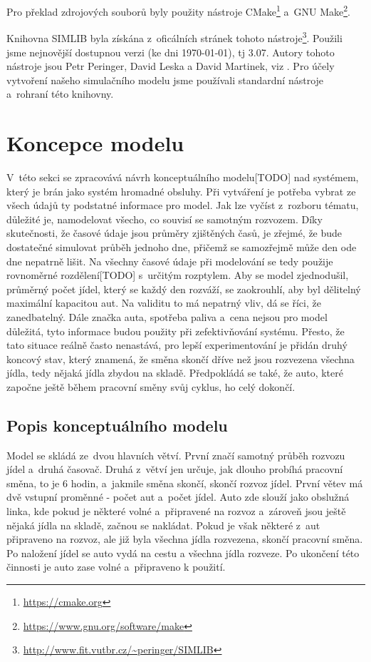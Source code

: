 \documentclass[a4paper, 11pt]{article}
\begin{document}
	Pro překlad zdrojových souborů byly použity nástroje
	CMake\footnote{\url{https://cmake.org}}
	a~GNU Make\footnote{\url{https://www.gnu.org/software/make}}.

	Knihovna SIMLIB byla získána z~oficálních stránek tohoto
	nástroje\footnote{\url{http://www.fit.vutbr.cz/~peringer/SIMLIB}}.
	Použili jsme nejnovější dostupnou verzi (ke dni \today), tj 3.07.
	Autory tohoto nástroje jsou Petr Peringer, David Leska a David Martinek,
	viz \cite{SIMLIB}. Pro účely vytvoření našeho simulačního modelu jsme
	používali standardní nástroje a~rohraní této knihovny.



	\section{Koncepce modelu}

	V~této sekci se zpracovává návrh konceptuálního modelu[TODO] nad
	systémem, který je brán jako systém hromadné obsluhy. Při vytváření
	je potřeba vybrat ze všech údajů ty podstatné informace pro model. Jak lze
	vyčíst z~rozboru tématu, důležité je, namodelovat všecho, co souvisí
	se samotným rozvozem. Díky skutečnosti, že časové údaje jsou průměry
	zjištěných časů, je zřejmé, že bude dostatečné simulovat průběh
	jednoho dne, přičemž se samozřejmě může den ode dne nepatrně lišit.
	Na všechny časové údaje při modelování se tedy použije rovnoměrné
	rozdělení[TODO] s~určitým rozptylem. Aby se model zjednodušil,
	průměrný počet jídel, který se každý den rozváží, se zaokrouhlí,
	aby byl dělitelný maximální kapacitou aut. Na validitu to má nepatrný
	vliv, dá se říci, že zanedbatelný. Dále značka auta, spotřeba paliva
	a~cena nejsou pro model důležitá, tyto informace budou použity při
	zefektivňování systému. Přesto, že tato situace reálně často nenastává,
	pro lepší experimentování je přidán druhý koncový stav, který znamená,
	že směna skončí dříve než jsou rozvezena všechna jídla, tedy nějaká
	jídla zbydou na skladě. Předpokládá se také, že auto, které započne
	ještě během pracovní směny svůj cyklus, ho celý dokončí.


	\subsection{Popis konceptuálního modelu}

	Model se skládá ze~dvou hlavních větví. První značí samotný průběh
	rozvozu jídel a~druhá časovač. Druhá z~větví jen určuje, jak dlouho
	probíhá pracovní směna, to je 6 hodin, a~jakmile směna skončí, skončí
	rozvoz jídel. První větev má dvě vstupní proměnné - počet aut a~počet
	jídel. Auto zde slouží jako obslužná linka, kde pokud je některé volné
	a~připravené na rozvoz a~zároveň jsou ještě nějaká jídla na skladě,
	začnou se nakládat. Pokud je však některé z~aut připraveno na rozvoz,
	ale již byla všechna jídla rozvezena, skončí pracovní směna. Po
	naložení jídel se auto vydá na cestu a všechna jídla rozveze. Po ukončení
	této činnosti je auto zase volné a~připraveno k použití.
\end{document}
